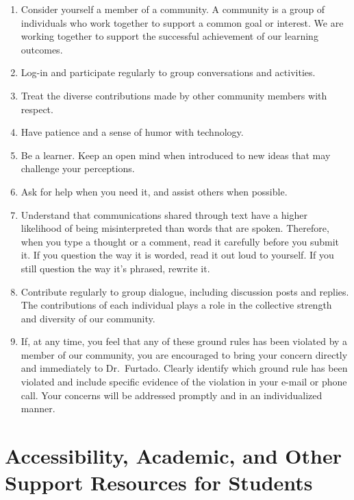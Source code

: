 \documentclass[
  letterpaper,
  DIV=11,
  numbers=noendperiod]{scrartcl}
\providecommand{\tightlist}{%
  \setlength{\itemsep}{0pt}\setlength{\parskip}{0pt}}\usepackage{longtable,booktabs,array}
\begin{document}
\begin{enumerate}
\def\labelenumi{\arabic{enumi}.}
\tightlist
\item
  Consider yourself a member of a community. A community is a group of
  individuals who work together to support a common goal or interest. We
  are working together to support the successful achievement of our
  learning outcomes.
\item
  Log-in and participate regularly to group conversations and
  activities.
\item
  Treat the diverse contributions made by other community members with
  respect.
\item
  Have patience and a sense of humor with technology.
\item
  Be a learner. Keep an open mind when introduced to new ideas that may
  challenge your perceptions.
\item
  Ask for help when you need it, and assist others when possible.
\item
  Understand that communications shared through text have a higher
  likelihood of being misinterpreted than words that are spoken.
  Therefore, when you type a thought or a comment, read it carefully
  before you submit it. If you question the way it is worded, read it
  out loud to yourself. If you still question the way it's phrased,
  rewrite it.
\item
  Contribute regularly to group dialogue, including discussion posts and
  replies. The contributions of each individual plays a role in the
  collective strength and diversity of our community.
\item
  If, at any time, you feel that any of these ground rules has been
  violated by a member of our community, you are encouraged to bring
  your concern directly and immediately to Dr.~Furtado. Clearly identify
  which ground rule has been violated and include specific evidence of
  the violation in your e-mail or phone call. Your concerns will be
  addressed promptly and in an individualized manner.
\end{enumerate}

\hypertarget{accessibility-academic-and-other-support-resources-for-students}{%
\section{Accessibility, Academic, and Other Support Resources for
Students}\label{accessibility-academic-and-other-support-resources-for-students}}
\end{document}
